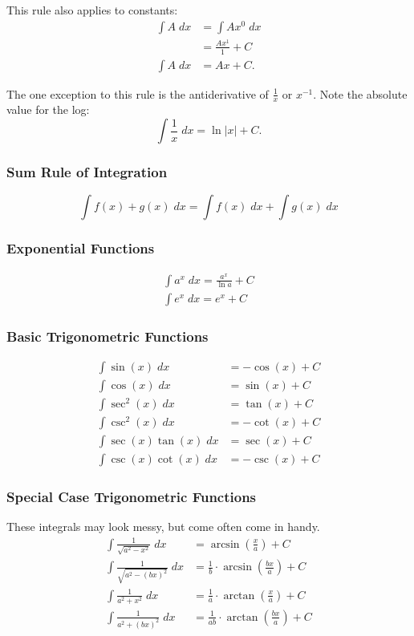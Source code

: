 \documentclass[12pt]{article}
\begin{document}
\noindent This rule also applies to constants:
\begin{align*}
	\int A \; dx &= \int A x^0 \; dx \\
	&= \frac{A x^1}{1} + C \\[5pt]
	\int A \; dx &= Ax + C.
\end{align*}

\noindent The one exception to this rule is the antiderivative of $\frac{1}{x}$ or $x^{-1}$. Note the absolute value for the log:
\[ \int \frac{1}{x} \; dx = \ln |x| + C. \]

\subsubsection{Sum Rule of Integration}
\[ \int f(x) + g(x) \; dx = \int f(x) \; dx + \int g(x) \; dx \]

\subsubsection{Exponential Functions}
\begin{gather*}
	\int a^x \; dx = \frac{a^x}{\ln a} + C \\[5pt]
	\int e^x \; dx = e^x + C
\end{gather*}

\subsubsection{Basic Trigonometric Functions}
\begin{align*}
	\int \sin(x) \; dx &= -\cos(x) + C \\[5pt]
	\int \cos(x) \; dx &= \sin(x) + C \\[5pt]
	\int \sec^2(x) \; dx &= \tan(x) + C \\[5pt]
	\int \csc^2(x) \; dx &= -\cot(x) + C \\[5pt]
	\int \sec(x) \tan(x) \; dx &= \sec(x) + C \\[5pt]
	\int \csc(x) \cot(x) \; dx &= -\csc(x) + C
\end{align*}

\subsubsection{Special Case Trigonometric Functions}
These integrals may look messy, but come often come in handy.
\begin{align*}
	\int \frac{1}{\sqrt{a^2 - x^2}} \; dx &= \arcsin \left( \frac{x}{a} \right) + C \\[5pt]
	\int \frac{1}{\sqrt{a^2 - (bx)^2}} \; dx &= \frac{1}{b} \cdot \arcsin \left( \frac{bx}{a} \right) + C \\[5pt]
	\int \frac{1}{a^2 + x^2} \; dx &= \frac{1}{a} \cdot \arctan \left( \frac{x}{a} \right) + C \\[5pt]
	\int \frac{1}{a^2 + (bx)^2} \; dx &= \frac{1}{ab} \cdot \arctan \left( \frac{bx}{a} \right) + C
\end{align*}
\end{document}
